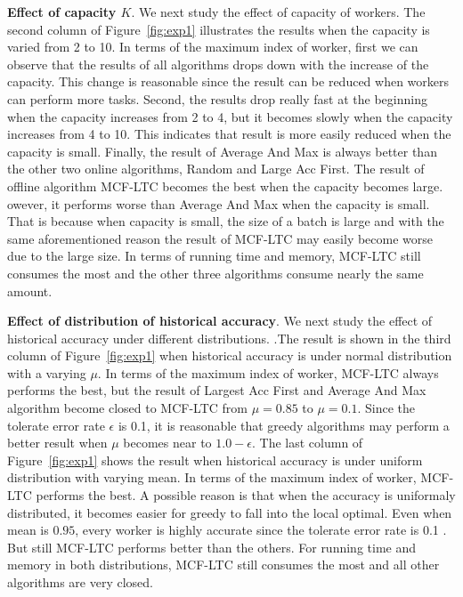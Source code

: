 \textbf{Effect of capacity $K$}.
We next study the effect of capacity of workers. 
The second column of Figure~\ref{fig:exp1} illustrates the results when the capacity is varied from 2 to 10. 
In terms of the maximum index of worker, first we can observe that the results of all algorithms drops down with the increase of the capacity. 
This change is reasonable since the result can be reduced when workers can perform more tasks. 
Second, the results drop really fast at the beginning when the capacity increases from 2 to 4, but it becomes slowly when the capacity increases from 4 to 10. 
This indicates that result is more easily reduced when the capacity is small. 
Finally, the result of Average And Max is always better than the other two online algorithms, 
Random and Large Acc First. 
The result of offline algorithm MCF-LTC becomes the best when the capacity becomes large. 
owever, it performs worse than Average And Max when the capacity is small. 
That is because when capacity is small, the size of a batch is large and with the same aforementioned reason the result of MCF-LTC may easily become worse due to the large size.
 In terms of running time and memory, MCF-LTC still consumes the most and the other three algorithms consume nearly the same amount.

 \textbf{Effect of distribution of historical accuracy}.
We next study the effect of historical accuracy under different distributions.
.The result is shown in the third column of Figure~\ref{fig:exp1} when historical accuracy is under normal distribution with a varying $\mu$.
In terms of the maximum index of worker, MCF-LTC always performs the best, but the result of Largest Acc First and Average And Max algorithm become closed to MCF-LTC from $\mu = 0.85$ to $\mu = 0.1$. 
Since the tolerate error rate $\epsilon$ is 0.1, it is reasonable that greedy algorithms may perform a better result when $\mu$ becomes near to $1.0 - \epsilon$.
The last column of Figure~\ref{fig:exp1} shows the result when historical accuracy is under uniform distribution with varying mean.
In terms of the maximum index of worker, MCF-LTC performs the best. 
A possible reason is that when the accuracy is uniformaly distributed, it becomes easier for greedy to fall into the local optimal.
Even when mean is $0.95$, every worker is highly accurate since the tolerate error rate is 0.1 .
But still MCF-LTC performs better than the others.
For running time and memory in both distributions, MCF-LTC still consumes the most and all other algorithms are very closed.


